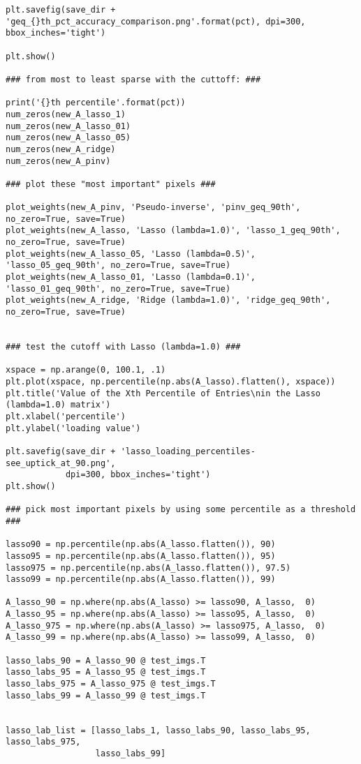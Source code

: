 \documentclass[10pt]{article}
\begin{document}
\begin{lstlisting}
plt.savefig(save_dir + 'geq_{}th_pct_accuracy_comparison.png'.format(pct), dpi=300, bbox_inches='tight')

plt.show()

### from most to least sparse with the cuttoff: ###

print('{}th percentile'.format(pct))
num_zeros(new_A_lasso_1)
num_zeros(new_A_lasso_01)
num_zeros(new_A_lasso_05)
num_zeros(new_A_ridge)
num_zeros(new_A_pinv)

### plot these "most important" pixels ###

plot_weights(new_A_pinv, 'Pseudo-inverse', 'pinv_geq_90th', no_zero=True, save=True)
plot_weights(new_A_lasso, 'Lasso (lambda=1.0)', 'lasso_1_geq_90th', no_zero=True, save=True)
plot_weights(new_A_lasso_05, 'Lasso (lambda=0.5)', 'lasso_05_geq_90th', no_zero=True, save=True)
plot_weights(new_A_lasso_01, 'Lasso (lambda=0.1)', 'lasso_01_geq_90th', no_zero=True, save=True)
plot_weights(new_A_ridge, 'Ridge (lambda=1.0)', 'ridge_geq_90th', no_zero=True, save=True)


### test the cutoff with Lasso (lambda=1.0) ###

xspace = np.arange(0, 100.1, .1)
plt.plot(xspace, np.percentile(np.abs(A_lasso).flatten(), xspace))
plt.title('Value of the Xth Percentile of Entries\nin the Lasso (lambda=1.0) matrix')
plt.xlabel('percentile')
plt.ylabel('loading value')

plt.savefig(save_dir + 'lasso_loading_percentiles-see_uptick_at_90.png',
            dpi=300, bbox_inches='tight')
plt.show()

### pick most important pixels by using some percentile as a threshold ###

lasso90 = np.percentile(np.abs(A_lasso.flatten()), 90)
lasso95 = np.percentile(np.abs(A_lasso.flatten()), 95)
lasso975 = np.percentile(np.abs(A_lasso.flatten()), 97.5)
lasso99 = np.percentile(np.abs(A_lasso.flatten()), 99)

A_lasso_90 = np.where(np.abs(A_lasso) >= lasso90, A_lasso,  0)
A_lasso_95 = np.where(np.abs(A_lasso) >= lasso95, A_lasso,  0)
A_lasso_975 = np.where(np.abs(A_lasso) >= lasso975, A_lasso,  0)
A_lasso_99 = np.where(np.abs(A_lasso) >= lasso99, A_lasso,  0)

lasso_labs_90 = A_lasso_90 @ test_imgs.T
lasso_labs_95 = A_lasso_95 @ test_imgs.T
lasso_labs_975 = A_lasso_975 @ test_imgs.T
lasso_labs_99 = A_lasso_99 @ test_imgs.T


lasso_lab_list = [lasso_labs_1, lasso_labs_90, lasso_labs_95, lasso_labs_975,
                  lasso_labs_99]


\end{lstlisting}
\end{document}
